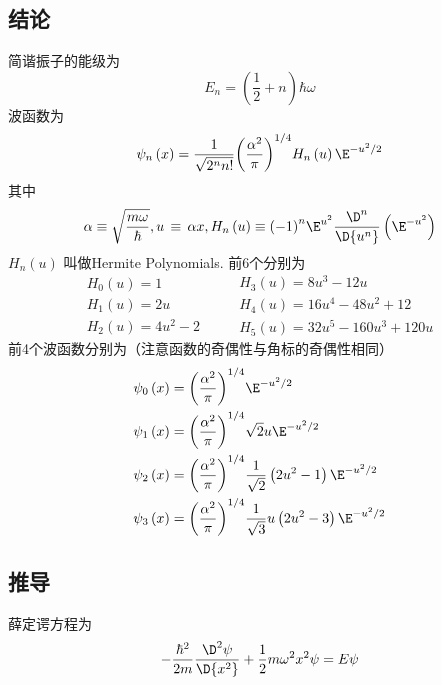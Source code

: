 
\subsection{结论}

简谐振子的能级为
\begin{equation}
{E_n} = \left( {\frac{1}{2} + n} \right)\hbar \omega 
\end{equation}
波函数为
\begin{equation}
{\psi_n}\left( x \right) = \frac{1}{{\sqrt {{2^n}n!} }}{\left( {\frac{{{\alpha ^2}}}{\pi }} \right)^{1/4}}{H_n}\left( u \right){\E^{ - {u^2}/2}}
\end{equation}
其中
\begin{equation}
\alpha  \equiv \sqrt {\frac{{m\omega }}{\hbar }} , u\, \equiv \,\alpha x, {H_n}\left( u \right) \equiv {\left( { - 1} \right)^n}{\E^{{u^2}}}\frac{{{\D^n}}}{{\D{u^n}}}\left( {{\E^{ - {u^2}}}} \right)
\end{equation}
${H_n}\left( u \right)$ 叫做Hermite Polynomials. 前6个分别为
\begin{equation}
\begin{array}{l}
{H_0}\left( u \right) = 1\\
{H_1}\left( u \right) = 2u\\
{H_2}\left( u \right) = 4{u^2} - 2
\end{array}
\qquad
\begin{array}{l}
{H_3}\left( u \right) = 8{u^3} - 12u\\
{H_4}\left( u \right) = 16{u^4} - 48{u^2} + 12\\
{H_5}\left( u \right) = 32{u^5} - 160{u^3} + 120u
\end{array}
\end{equation}
前4个波函数分别为（注意函数的奇偶性与角标的奇偶性相同）
\begin{equation}\begin{aligned}
{\psi_0}\left( x \right) &= {\left( {\frac{{{\alpha ^2}}}{\pi }} \right)^{1/4}}{\E^{ - {u^2}/2}}\\
{\psi_1}\left( x \right) &= {\left( {\frac{{{\alpha ^2}}}{\pi }} \right)^{1/4}}\sqrt 2 u{\E^{ - {u^2}/2}} \\
{\psi_2}\left( x \right) &= {\left( {\frac{{{\alpha ^2}}}{\pi }} \right)^{1/4}}\frac{1}{{\sqrt 2 }}\left( {2{u^2} - 1} \right){\E^{ - {u^2}/2}}\\
{\psi_3}\left( x \right) &= {\left( {\frac{{{\alpha ^2}}}{\pi }} \right)^{1/4}}\frac{1}{{\sqrt 3 }}u\left( {2{u^2} - 3} \right){\E^{ - {u^2}/2}}
\end{aligned}\end{equation}
\subsection{推导}%

薛定谔方程为
\begin{equation}
- \frac{{{\hbar ^2}}}{{2m}}\frac{{{\D^2}\psi }}{{\D{x^2}}} + \frac{1}{2}m{\omega ^2}{x^2}\psi  = E\psi
\end{equation}